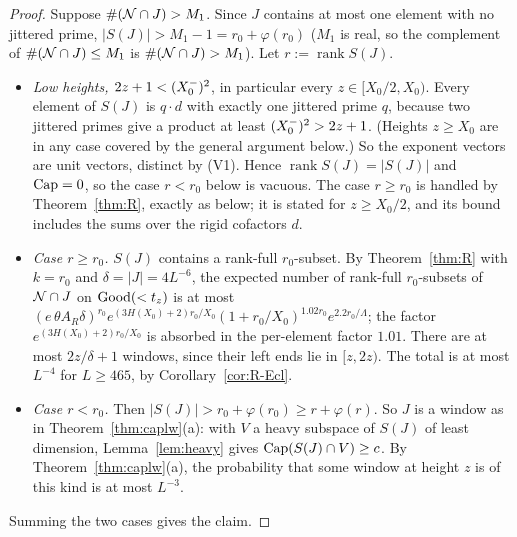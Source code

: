 \begin{proof}
Suppose $\#(\mathcal{N}\cap J)>M_1$. Since $J$ contains at most one element with no jittered prime, $|S(J)|>M_1-1=r_0+\varphi(r_0)$
($M_1$ is real, so the complement of $\#(\mathcal{N}\cap J)\le M_1$ is $\#(\mathcal{N}\cap J)>M_1$). Let $r:=\operatorname{rank}S(J)$.
\begin{itemize}
\item \emph{Low heights, $2z+1<(X_0^{-})^2$}, in particular every $z\in[X_0/2,X_0)$. Every element of $S(J)$ is $q\cdot d$ with
  exactly one jittered prime $q$, because two jittered primes give a product at least $(X_0^{-})^2>2z+1$. (Heights $z\ge X_0$ are in
  any case covered by the general argument below.) So the exponent vectors are unit vectors, distinct by (V1). Hence
  $\operatorname{rank}S(J)=|S(J)|$ and $\operatorname{Cap}=0$, so the case $r<r_0$ below is vacuous. The case $r\ge r_0$ is handled by
  Theorem~\ref{thm:R}, exactly as below; it is stated for $z\ge X_0/2$, and its bound includes the sums over the rigid
  cofactors $d$.
\item \emph{Case $r\ge r_0$.} $S(J)$ contains a rank-full $r_0$-subset. By Theorem~\ref{thm:R} with $k=r_0$ and
  $\delta=|J|=4L^{-6}$, the expected number of rank-full $r_0$-subsets of $\mathcal{N}\cap J$ on $\mathrm{Good}(<t_z)$ is at most
  $(e\,\theta A_R\delta)^{r_0}e^{(3H(X_0)+2)r_0/X_0}(1+r_0/X_0)^{1.02r_0}e^{2.2r_0/\Lambda}$; the factor $e^{(3H(X_0)+2)r_0/X_0}$
  is absorbed in the per-element factor $1.01$. There are at most $2z/\delta+1$ windows, since their left ends lie in
  $[z,2z)$. The total is at most $L^{-4}$ for $L\ge465$, by Corollary~\ref{cor:R-Ecl}.
\item \emph{Case $r<r_0$.} Then $|S(J)|>r_0+\varphi(r_0)\ge r+\varphi(r)$. So $J$ is a window as in
  Theorem~\ref{thm:caplw}(a): with $V$ a heavy subspace of $S(J)$ of least dimension, Lemma~\ref{lem:heavy} gives
  $\operatorname{Cap}(S(J)\cap V)\ge c$. By Theorem~\ref{thm:caplw}(a), the probability that some window at height $z$ is of this kind
  is at most $L^{-3}$.
\end{itemize}
Summing the two cases gives the claim.
\end{proof}

